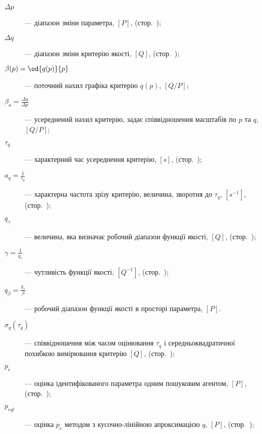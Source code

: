 \begin{description}
  \item[$\Delta p$]  ---
    діапазон зміни параметра,
    $[P]$, (стор.~\pageref{atu:d:Delta_q});

  \item[$\Delta q$]  ---
    діапазон зміни критерію якості,
    $[Q]$, (стор.~\pageref{atu:d:Delta_q});

  \item[$\beta(p) = \od{q(p)}{p}$]  ---
    поточний нахил графіка критерію
    $q(p)$, $[Q/P]$;

  \item[$\beta_a = \frac{\Delta q}{\Delta p} $]  ---
    усереднений нахил критерію, задає співвідношення масштабів по
    $p$ та $q$, $[Q/P]$;

  \item[$\tau_q$]  ---
    характерний час усереднення критерію,
    $[s]$, (стор.~\pageref{atu:d:tau_q});

  \item[$a_q = \frac{1}{\tau_q} $]  ---
    характерна частота зрізу критерію, величина, зворотня до
    $\tau_q$, $[s^{-1}]$, (стор.~\pageref{atu:d:a_q});

  \item[$q_\gamma $]  ---
    величина, яка визначає робочий діапазон функції якості,
    $[Q]$, (стор.~\pageref{atu:d:q_gamma});

  \item[$\gamma = \frac{1}{q_\gamma} $]  ---
    чутливість функції якості,
    $[Q^{-1}]$, (стор.~\pageref{atu:d:gamma});

  \item[$q_\beta = \frac{q_\gamma}{\beta} $]  ---
    робочий діапазон функції якості в просторі параметра,
    $[P]$.

  \item[$ \sigma_q (\tau_q)  $]  ---
   співвідношення між часом оцінювання $\tau_q $
   і середньоквадратичної похибкою вимірювання критерію
    $[Q]$, (стор.~\pageref{atu:d:sigma_q});


  \item[$p_{e} $]  ---
    оцінка ідентифікованого параметра одним пошуковим агентом,
    $[P]$, (стор.~\pageref{atu:d:p_e});

  \item[$p_{eql} $]  ---
   оцінка $ p_e $ методом з кусочно-лінійною апроксимацією $q$,
   $[P]$, (стор.~\pageref{atu:d:p_eql});


\end{description}
